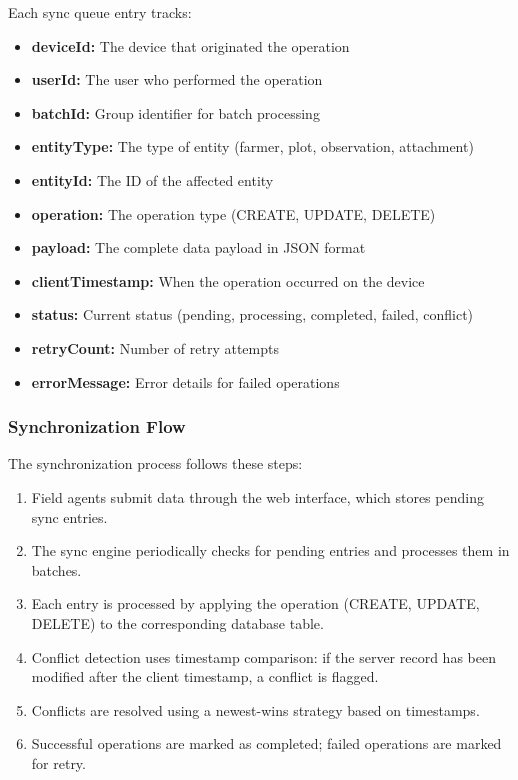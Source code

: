 Each sync queue entry tracks:
\begin{itemize}
  \item \textbf{deviceId:} The device that originated the operation
  \item \textbf{userId:} The user who performed the operation
  \item \textbf{batchId:} Group identifier for batch processing
  \item \textbf{entityType:} The type of entity (farmer, plot, observation, attachment)
  \item \textbf{entityId:} The ID of the affected entity
  \item \textbf{operation:} The operation type (CREATE, UPDATE, DELETE)
  \item \textbf{payload:} The complete data payload in JSON format
  \item \textbf{clientTimestamp:} When the operation occurred on the device
  \item \textbf{status:} Current status (pending, processing, completed, failed, conflict)
  \item \textbf{retryCount:} Number of retry attempts
  \item \textbf{errorMessage:} Error details for failed operations
\end{itemize}

\subsubsection{Synchronization Flow}

The synchronization process follows these steps:
\begin{enumerate}
  \item Field agents submit data through the web interface, which stores pending sync entries.
  \item The sync engine periodically checks for pending entries and processes them in batches.
  \item Each entry is processed by applying the operation (CREATE, UPDATE, DELETE) to the corresponding database table.
  \item Conflict detection uses timestamp comparison: if the server record has been modified after the client timestamp, a conflict is flagged.
  \item Conflicts are resolved using a newest-wins strategy based on timestamps.
  \item Successful operations are marked as completed; failed operations are marked for retry.
\end{enumerate}

